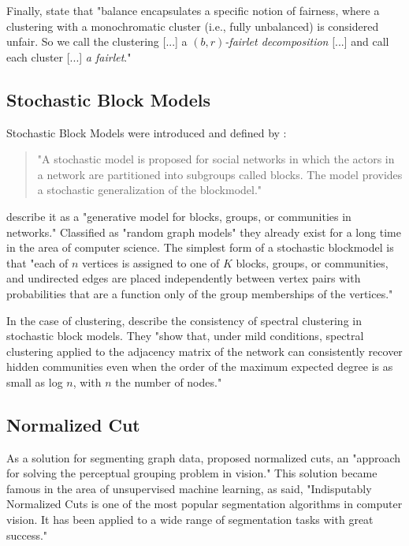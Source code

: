 Finally, \textcite[4]{Chierichetti2018} state that "balance encapsulates a specific notion of fairness, where a clustering with a monochromatic cluster (i.e., fully unbalanced) is considered unfair. So we call the clustering [...] a $(b, r)$\textit{-fairlet decomposition} [...] and call each cluster [...] \textit{a fairlet}." \autocite[4]{Chierichetti2018}


\subsection{Stochastic Block Models}

Stochastic Block Models were introduced and defined by \textcite[]{Holland1983}:

\begin{quote}
"A stochastic model is proposed for social networks in which the actors in a network are partitioned into subgroups called blocks. The model provides a stochastic generalization of the blockmodel."

\autocite[1]{Holland1983}
\end{quote}

\textcite[1]{Karrer2010StochasticNetworks} describe it as a "generative model for blocks, groups, or communities in networks." Classified as "random graph models" they already exist for a long time in the area of computer science.
The simplest form of a stochastic blockmodel is that "each of $n$ vertices is assigned to one of $K$ blocks, groups, or communities, and undirected edges are placed independently between vertex pairs with probabilities that are a function only of the group memberships of the vertices." \autocite[1]{Karrer2010StochasticNetworks}

In the case of clustering, \textcite[]{Lei2013} describe the consistency of spectral clustering in stochastic block models. They "show that, under mild conditions, spectral clustering applied to the adjacency matrix of the network can consistently recover hidden communities even when the order of the maximum expected degree is as small as log $n$, with $n$ the number of nodes." \autocite[1]{Lei2013}


\subsection{Normalized Cut}

As a solution for segmenting graph data, \textcite[]{Shi2000} proposed normalized cuts, an "approach for solving the perceptual grouping problem in vision." \autocite[1]{Shi2000} This solution became famous in the area of unsupervised machine learning, as \textcite[]{Eriksson2011} said, "Indisputably Normalized Cuts is one of the most popular segmentation algorithms in computer vision. It has been applied to a wide range of segmentation tasks with great success." \autocite[1]{Eriksson2011}
